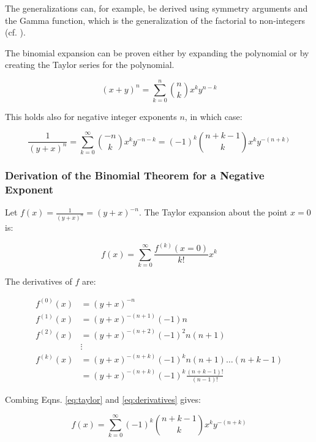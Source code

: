 The generalizations can, for example, be derived using symmetry arguments and the Gamma function, which is the generalization of the factorial to non-integers (cf.  ).


The binomial expansion can be proven either by expanding the polynomial or by creating the Taylor series for the polynomial.

\begin{equation}
(x + y)^n = \sum_{k=0}^n {n \choose k} x^k y^{n-k}
\end{equation}

This holds also for negative integer exponents $n$, in which case:

\begin{equation}
\frac{1}{(y+x)^n} = \sum_{k=0}^\infty {-n \choose k} x^k y^{-n-k} = (-1)^k { n+k-1 \choose k} x^k y^{-(n+k)}
\end{equation}

\subsubsection{Derivation of the Binomial Theorem for a Negative Exponent}

Let $f(x) = \frac{1}{(y+x)^n} = (y+x)^{-n}$. The Taylor expansion about the point $x=0$ is:

\begin{equation}
f(x) = \sum_{k=0}^\infty \frac{f^{(k)}(x=0)}{k!} x^k
\label{eq:taylor}
\end{equation}

The derivatives of $f$ are:

\begin{equation}
\begin{array}{ll}
f^{(0)}(x) &= (y+x)^{-n}\\
f^{(1)}(x) &= (y+x)^{-(n+1)}(-1)n\\
f^{(2)}(x) &= (y+x)^{-(n+2)}(-1)^2 n(n+1)\\
&\vdots\\
f^{(k)}(x) &= (y+x)^{-(n+k)}(-1)^k n(n+1)\hdots	(n+k-1)\\
&=  (y+x)^{-(n+k)}(-1)^k \frac{(n+k-1)!}{(n-1)!}
\end{array}
\label{eq:derivatives}
\end{equation} 

Combing Eqns. \ref{eq:taylor} and \ref{eq:derivatives} gives:

\begin{equation}
f(x) = \sum_{k=0}^\infty (-1)^k {n+k-1 \choose k} x^k y^{-(n+k)}
\end{equation}


